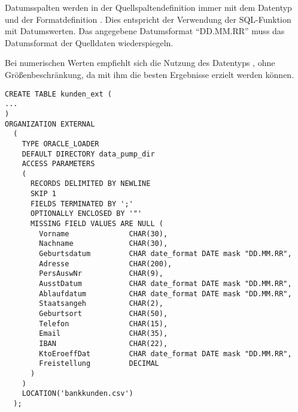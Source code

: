           Datumsspalten werden in der Quellspaltendefinition immer mit dem Datentyp  und der Formatdefinition . Dies entspricht der Verwendung der SQL-Funktion  mit Datumswerten. Das angegebene Datumsformat \enquote{DD.MM.RR} muss das Datumsformat der Quelldaten wiederspiegeln.

          Bei numerischen Werten empfiehlt sich die Nutzung des Datentyps , ohne Größenbeschränkung, da mit ihm die besten Ergebnisse erzielt werden können.
          \begin{lstlisting}[caption={Festlegen der Access parameter},label=admin928a,language=oracle_sql]
CREATE TABLE kunden_ext (
...
)
ORGANIZATION EXTERNAL
  (
    TYPE ORACLE_LOADER
    DEFAULT DIRECTORY data_pump_dir
    ACCESS PARAMETERS
    (
      RECORDS DELIMITED BY NEWLINE
      SKIP 1
      FIELDS TERMINATED BY ';'
      OPTIONALLY ENCLOSED BY '"'
      MISSING FIELD VALUES ARE NULL (
        Vorname              CHAR(30),
        Nachname             CHAR(30),
        Geburtsdatum         CHAR date_format DATE mask "DD.MM.RR",
        Adresse              CHAR(200),
        PersAuswNr           CHAR(9),
        AusstDatum           CHAR date_format DATE mask "DD.MM.RR",
        Ablaufdatum          CHAR date_format DATE mask "DD.MM.RR",
        Staatsangeh          CHAR(2),
        Geburtsort           CHAR(50),
        Telefon              CHAR(15),
        Email                CHAR(35),
        IBAN                 CHAR(22),
        KtoEroeffDat         CHAR date_format DATE mask "DD.MM.RR",
        Freistellung         DECIMAL
      )
    )
    LOCATION('bankkunden.csv')
  );
          \end{lstlisting}
